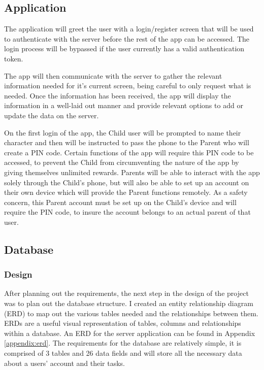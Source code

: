 \subsection{Application}
The application will greet the user with a login/register screen that will be used to authenticate with the server before the rest of the app can be accessed.
The login process will be bypassed if the user currently has a valid authentication token.

The app will then communicate with the server to gather the relevant information needed for it's current screen, being careful to only request what is needed.
Once the information has been received, the app will display the information in a well-laid out manner and provide relevant options to add or update the data on the server.

On the first login of the app, the Child user will be prompted to name their character and then will be instructed to pass the phone to the Parent who will create a PIN code.
Certain functions of the app will require this PIN code to be accessed, to prevent the Child from circumventing the nature of the app by giving themselves unlimited rewards.
Parents will be able to interact with the app solely through the Child's phone, but will also be able to set up an account on their own device which will provide the Parent functions remotely.
As a safety concern, this Parent account must be set up on the Child's device and will require the PIN code, to insure the account belongs to an actual parent of that user.

\subsection{Database}
\subsubsection{Design}
After planning out the requirements, the next step in the design of the project was to plan out the database structure.
I created an entity relationship diagram (ERD) to map out the various tables needed and the relationships between them.
ERDs are a useful visual representation of tables, columns and relationships within a database.
An ERD for the server application can be found in Appendix \ref{appendix:erd}.
The requirements for the database are relatively simple, it is comprised of 3 tables and 26 data fields and will store all the necessary data about a users' account and their tasks.


